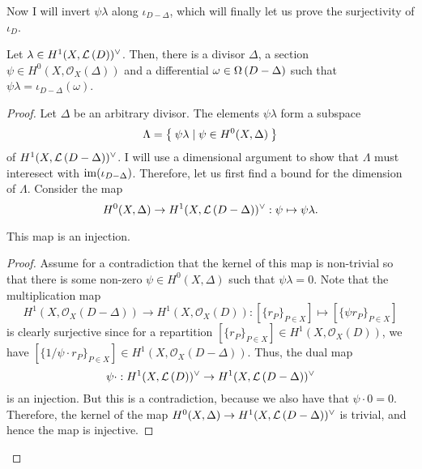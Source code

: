 Now I will invert $\psi\lambda$ along $\iota_{D-\Delta}$, which will finally
let us prove the surjectivity of $\iota_{D}$.
\begin{lemm}\label{lemm:invert_iota}
  Let $\lambda\in H^1(X,\mathcal{L}\left(D\right))^{\vee}$. Then, there is a divisor $\Delta$,
  a section $\psi\in H^{0}(X,\mathscr{O}_X(\Delta))$ and a differential
  $\omega\in\Omega\left(D-\Delta\right)$ such that $\psi\lambda
  =\iota_{D-\Delta}(\omega)$.
\end{lemm}
\begin{proof}
  Let $\Delta$ be an arbitrary divisor. The elements $\psi\lambda$ form a
  subspace
  \[
    \Lambda=\Set{\psi\lambda\mid\psi\in H^{0}(X,\Delta)}
  \]
  of $H^1(X,\mathcal{L}\left(D-\Delta\right))^{\vee}$. I will use a dimensional argument to show that
  $\Lambda$ must interesect with $\operatorname{im}(\iota_{D-\Delta})$. Therefore,
  let us first find a bound for the dimension of $\Lambda$. Consider the map
  \[H^{0}(X,\Delta)\to H^1(X,\mathcal{L}\left(D-\Delta\right))^{\vee}:\psi\mapsto\psi\lambda.\]
  \begin{claim}
    This map is an injection.
  \end{claim}
  {\renewcommand{\qedsymbol}{$\blacksquare$}
    \begin{proof}
      Assume for a contradiction that the kernel of this map is non-trivial
      so that there is some non-zero $\psi\in H^{0}(X,\Delta)$ such that
      $\psi\lambda=0$. Note that the multiplication map
      \[
        H^{1}(X,\mathscr{O}_X(D-\Delta))\to H^{1}(X,\mathscr{O}_X(D))
        :[\{r_{P}\}_{P\in X}]\mapsto [\{\psi r_{P}\}_{P\in X}]
      \]
      is clearly surjective since for a repartition
      $[\{r_{P}\}_{P\in X}]\in H^{1}(X,\mathscr{O}_X(D))$, we have
      $[\{1/\psi\cdot r_{P}\}_{P\in X}]\in H^{1}(X,\mathscr{O}_X(D-\Delta))$.
      Thus, the dual map
      \[\psi\cdot:H^1(X,\mathcal{L}\left(D\right))^{\vee}\to H^1(X,\mathcal{L}\left(D-\Delta\right))^{\vee}\]
      is an injection. But this is a contradiction, because we also have that
      $\psi\cdot 0=0$. Therefore, the kernel of the map
      $H^{0}(X,\Delta)\to H^1(X,\mathcal{L}\left(D-\Delta\right))^{\vee}$ is trivial, and hence the map is
      injective.
    \end{proof}
  }


\end{proof}
